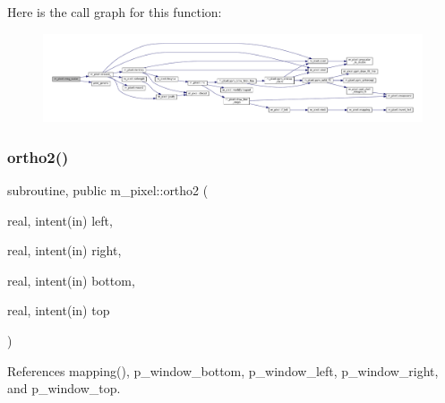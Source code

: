 Here is the call graph for this function\+:
\nopagebreak
\begin{figure}[H]
\begin{center}
\leavevmode
\includegraphics[width=350pt]{namespacem__pixel_af907f9c8cb0421cf9c5e6356e355382e_cgraph}
\end{center}
\end{figure}
\mbox{\label{namespacem__pixel_a80dece6adac704024a5a76efee697770}} 
\subsubsection{\texorpdfstring{ortho2()}{ortho2()}}
{\footnotesize\ttfamily subroutine, public m\+\_\+pixel\+::ortho2 (\begin{DoxyParamCaption}\item[{real, intent(in)}]{left,  }\item[{real, intent(in)}]{right,  }\item[{real, intent(in)}]{bottom,  }\item[{real, intent(in)}]{top }\end{DoxyParamCaption})}



References mapping(), p\+\_\+window\+\_\+bottom, p\+\_\+window\+\_\+left, p\+\_\+window\+\_\+right, and p\+\_\+window\+\_\+top.


